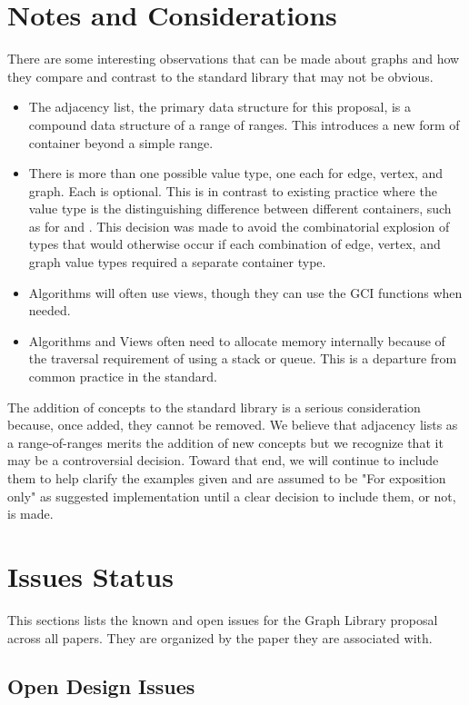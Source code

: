 \section{Notes and Considerations}
There are some interesting observations that can be made about graphs and how they compare and contrast to the 
standard library that may not be obvious.
\begin{itemize}
      \item The adjacency list, the primary data structure for this proposal, is a compound data structure of a
            range of ranges. This introduces a new form of container beyond a simple range.
      \item There is more than one possible value type, one each for edge, vertex, and graph. Each is optional.
            This is in contrast to existing practice where the value type is the distinguishing difference between
            different containers, such as for  and . This decision was made to
            avoid the combinatorial explosion of types that would otherwise occur if each combination of
            edge, vertex, and graph value types required a separate container type.
      \item Algorithms will often use views, though they can use the GCI functions when needed.
      \item Algorithms and Views often need to allocate memory internally because of the traversal requirement
            of using a stack or queue. This is a departure from common practice in the standard.
\end{itemize}

The addition of concepts to the standard library is a serious consideration because, once added, they cannot 
be removed. We believe that adjacency lists as a range-of-ranges merits the addition of new concepts but we recognize that it
may be a controversial decision. Toward that end, we will continue to include them to help clarify the examples given
and are assumed to be "For exposition only" as suggested implementation until a clear decision to include them, or not, 
is made.

\section{Issues Status}
This sections lists the known and open issues for the Graph Library proposal across all papers. They are organized
by the paper they are associated with.

\subsection{Open Design Issues}

